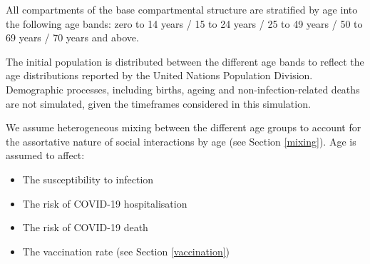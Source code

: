 All compartments of the base compartmental structure are stratified by age into the following age bands:
zero to 14 years / 15 to 24 years / 25 to 49 years / 50 to 69 years / 70 years and above.

The initial population is distributed between the different age bands to reflect the age distributions reported by the United Nations Population Division. Demographic processes, including births, ageing and non-infection-related deaths are not simulated, given the timeframes considered in this simulation.

We assume heterogeneous mixing between the different age groups to account for the assortative nature of social interactions by age (see Section \ref{mixing}).
Age is assumed to affect:
\begin{itemize}
    \item The susceptibility to infection
    \item The risk of COVID-19 hospitalisation
    \item The risk of COVID-19 death
    \item The vaccination rate (see Section \ref{vaccination})
\end{itemize}
